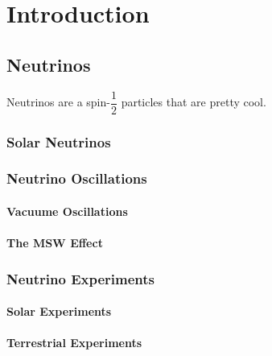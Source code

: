 
\chapter{Introduction}

\ifpdf
    \graphicspath{{introduction/figures/PNG/}{introduction/figures/PDF/}{introduction/figures/}}
\else
    \graphicspath{{introduction/figures/EPS/}{introduction/figures/}}
\fi


\section{Neutrinos}
Neutrinos are a spin-$\dfrac{1}{2}$ particles that are pretty cool.
\subsection{Solar Neutrinos}
\subsection{Neutrino Oscillations}
\subsubsection{Vacuume Oscillations}
\subsubsection{The MSW Effect}
\subsection{Neutrino Experiments}
\subsubsection{Solar Experiments}
\subsubsection{Terrestrial Experiments}


